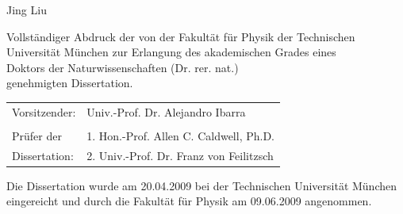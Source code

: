 \begin{titlepage}
\Large Jing Liu

\vspace{2. cm}

\normalsize Vollst\"andiger Abdruck der von der Fakult\"at f\"ur
Physik der Technischen Universit\"at M\"unchen zur Erlangung des
akademischen Grades eines \\
Doktors der Naturwissenschaften (Dr. rer. nat.) \\
genehmigten Dissertation. \\

\vspace{1.5 cm} 

\begin{table}[h]
  \centering
  \begin{tabular}{ll}
    Vorsitzender: & Univ.-Prof. Dr. Alejandro Ibarra\\ 
    & \\ 
    Pr\"ufer der & 1. Hon.-Prof. Allen C. Caldwell, Ph.D.\\ 
    Dissertation: & 2. Univ.-Prof. Dr. Franz von Feilitzsch \\ 
  \end{tabular}
\end{table}

\vspace{2.0 cm} 

Die Dissertation wurde am 20.04.2009 bei der Technischen Universit\"at
M\"unchen eingereicht und durch die Fakult\"at f\"ur Physik am
09.06.2009 angenommen. \\

\end{titlepage} 

\cleardoublepage

